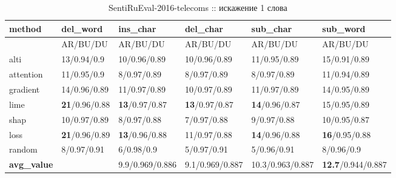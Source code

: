 \begin{table}[H]
  \centering
  \caption{SentiRuEval-2016-telecoms :: искажение 1 слова}
  {\renewcommand{\arraystretch}{1.5}
  {\fontsize{9pt}{10pt}\selectfont
  \begin{tabularx}{\textwidth}{|l|X|X|X|X|X|}
    \hline
     method    & del\_word         & ins\_char         & del\_char         & sub\_char         & sub\_word         \\
    \hline
     & AR/BU/DU & AR/BU/DU  & AR/BU/DU  & AR/BU/DU  & AR/BU/DU \\
    \hline
     alti      & 13/0.94/0.9 & 10/0.96/0.89 & 10/0.96/0.89 & 11/0.95/0.89 & 15/0.91/0.89 \\
    \hline
     attention & 11/0.95/0.9 & 8/0.97/0.89  & 8/0.97/0.89  & 8/0.97/0.89  & 11/0.94/0.89 \\
    \hline
     gradient  & 14/0.96/0.89 & 11/0.97/0.89 & 10/0.97/0.89 & 11/0.97/0.89 & 14/0.95/0.89 \\
    \hline
     lime      & \textbf{21}/0.96/0.88 & \textbf{13}/0.97/0.87 & \textbf{13}/0.97/0.87 & \textbf{14}/0.96/0.87 & 15/0.95/0.89 \\
    \hline
     shap      & 10/0.97/0.89 & 8/0.97/0.88  & 7/0.97/0.88  & 9/0.97/0.88  & 10/0.95/0.87 \\
    \hline
     loss      & \textbf{21}/0.96/0.89 & \textbf{13}/0.96/0.88 & 11/0.97/0.88 & \textbf{14}/0.96/0.88 & \textbf{16}/0.95/0.88 \\
    \hline
     random    & 8/0.97/0.91 & 6/0.98/0.9  & 5/0.97/0.91  & 5/0.96/0.91  & 8/0.96/0.9 \\
    \hline
     \textbf{avg\_value} & \cellcolor{gray!25} & 9.9/0.969/0.886 & 9.1/0.969/0.887 & 10.3/0.963/0.887 & \textbf{12.7}/0.944/0.887 \\
    \hline
    \end{tabularx}
    }
    }
\end{table}

